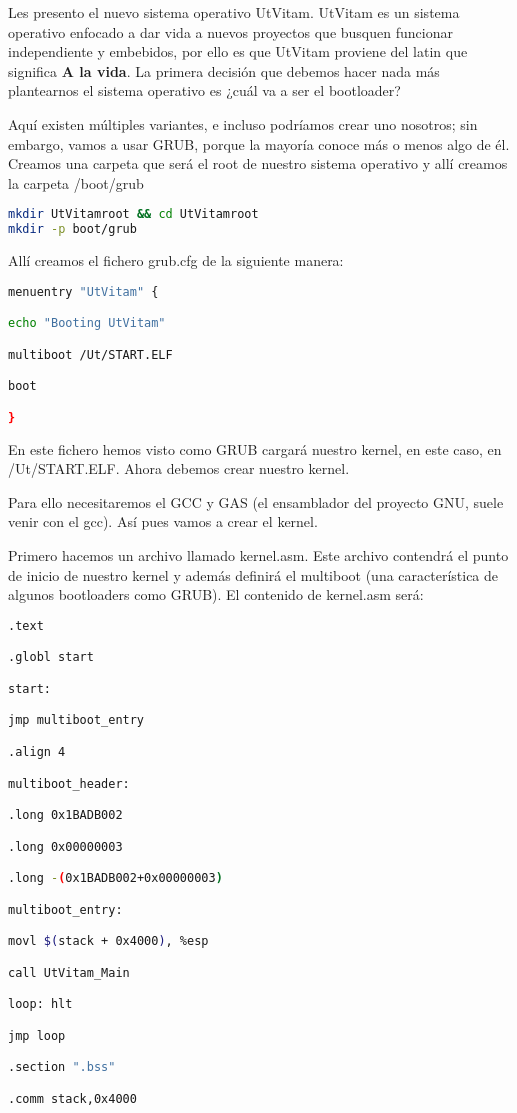 \documentclass[12pt, twoside]{report}
\begin{document}
Les presento el nuevo sistema operativo UtVitam. UtVitam es un sistema operativo enfocado a dar vida a nuevos proyectos que busquen funcionar independiente y embebidos, por ello es que UtVitam proviene del latin que significa \textbf{A la vida}. La primera decisión que debemos hacer nada más plantearnos el sistema operativo es ¿cuál va a ser el bootloader?

Aquí existen múltiples variantes, e incluso podríamos crear uno nosotros; sin embargo, vamos a usar GRUB, porque la mayoría conoce más o menos algo de él. Creamos una carpeta que será el root de nuestro sistema operativo y allí creamos la carpeta /boot/grub

\begin{lstlisting}[language=bash]
mkdir UtVitamroot && cd UtVitamroot
mkdir -p boot/grub
\end{lstlisting}

Allí creamos el fichero grub.cfg de la siguiente manera:

\begin{lstlisting}[language=bash]
menuentry "UtVitam" {

echo "Booting UtVitam"

multiboot /Ut/START.ELF

boot

}
\end{lstlisting}


En este fichero hemos visto como GRUB cargará nuestro kernel, en este caso, en /Ut/START.ELF. Ahora debemos crear nuestro kernel.

Para ello necesitaremos el GCC y GAS (el ensamblador del proyecto GNU, suele venir con el gcc). Así pues vamos a crear el kernel.

Primero hacemos un archivo llamado kernel.asm. Este archivo contendrá el punto de inicio de nuestro kernel y además definirá el multiboot (una característica de algunos bootloaders como GRUB). El contenido de kernel.asm será:

\begin{lstlisting}[language=bash]
.text

.globl start

start:

jmp multiboot_entry

.align 4

multiboot_header:

.long 0x1BADB002

.long 0x00000003

.long -(0x1BADB002+0x00000003)

multiboot_entry:

movl $(stack + 0x4000), %esp

call UtVitam_Main

loop: hlt

jmp loop

.section ".bss"

.comm stack,0x4000

\end{lstlisting}
\end{document}
